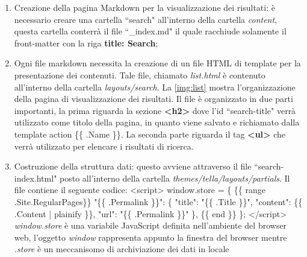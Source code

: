 \documentclass[target=bach,aauheader=]{thud}
\begin{document}
\begin{enumerate}
    \item Creazione della pagina Markdown per la visualizzazione dei risultati: è necessario creare una cartella ``search" all'interno della cartella \textit{content}, questa cartella conterrà il file ``\_index.md" il quale racchiude solamente il front-matter con la riga \textbf{{\selectfont title: Search}};
    \item Ogni file markdown necessita la creazione di un file HTML di template per la presentazione dei contenuti. Tale file, chiamato \textit{list.html} è contenuto all'interno della cartella \textit{layouts/search}.
    \newline \newline
    La \cref{img:list} mostra l'organizzazione della pagina di visualizzazione dei risultati. Il file è organizzato in due parti importanti, la prima riguarda la sezione \textbf{\textless h2\textgreater} dove l'id ``search-title" verrà utilizzato come titolo della pagina, in quanto viene salvato e richiamato dalla template action \{\{ .Name \}\}. 
    La seconda parte riguarda il tag \textbf{\textless ul\textgreater} che verrà utilizzato per elencare i risultati di ricerca.
    \item Costruzione della struttura dati: questo avviene attraverso il file ``search-index.html" posto all'interno della cartella \textit{themes/tella/layouts/partials}. Il file contiene il seguente codice:
    \newline \newline \textless script\textgreater 
    \newline window.store = \{ 
        \newline \{\{ range .Site.RegularPages\}\}
        \newline "\{\{ .Permalink \}\}": \{
        \newline    "title": "\{\{ .Title  \}\}",
        \newline    "content": \{\{ .Content | plainify \}\}, 
        \newline    "url": "\{\{ .Permalink \}\}"
        \newline \},
        \newline \{\{ end \}\}
    \newline \};
    \newline \textless /script\textgreater
    \newline \newline
    \textit{window.store} è una variabile JavaScript definita nell'ambiente del browser web, l'oggetto \textit{window} rappresenta appunto la finestra del browser mentre \textit{.store} è un meccanisomo di archiviazione dei dati in locale 

\end{enumerate}
\end{document}
